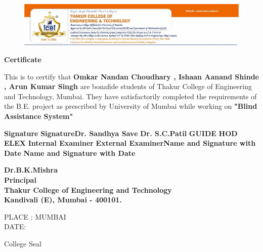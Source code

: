 \documentclass{book}
\begin{document}
	\thispagestyle{empty}
		
\begin{figure}[h]
	\centering
	\includegraphics[scale=0.63]{tcet.jpg}
\end{figure}

	\Huge
		\textbf{Certificate\\}
	\begin{doublespace}
			
	\Large
		This is to certify that \textbf{Omkar Nandan Choudhary , Ishaan Aanand Shinde , Arun Kumar Singh} are bonafide students of Thakur College of Engineering and Technology, Mumbai. They have satisfactorily completed the requirements of the B.E. project as prescribed by University of Mumbai while working on \textbf{"Blind Assistance System"}\
	\end{doublespace}
	
\begin{doublespace}
	\normalsize
	\centering
\textbf{Signature} \tab \textbf{Signature}\tab\textbf{Dr. Sandhya Save} \tab \textbf{Dr. S.C.Patil}
\tab\textbf{GUIDE} \tab \textbf{HOD ELEX} \tab\tab\tab\tab\tab\textbf{Internal Examiner} \tab \textbf{External Examiner}\tab\textbf{Name and Signature with Date} \tab \textbf{Name and Signature with Date}
\tab\tab\tab\tab
\end{doublespace}
\centering
\normalsize
\textbf{Dr.B.K.Mishra}\\
\textbf{Principal}\\
\tab\tab
\textbf{Thakur College of Engineering and Technology}\\
\textbf{Kandivali (E), Mumbai - 400101.}\\
\begin{flushleft}
	PLACE : MUMBAI \\
	DATE:
\end{flushleft}
\begin{flushright}
	College Seal
\end{flushright}
\end{document}
